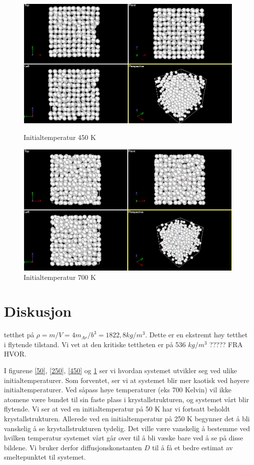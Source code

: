 \documentclass[paper=a4, fontsize=11pt]{scrartcl} %
\numberwithin{equation}{section} %
\numberwithin{figure}{section} %
\numberwithin{table}{section} %
\begin{document}
 \FloatBarrier
\begin{figure}[!htb]
  \includegraphics[width=\linewidth]{T=450}
  \caption{Initialtemperatur 450 K}\label{450}
\endminipage\hfill
{}
  \includegraphics[width=\linewidth]{T=700}
  \caption{Initialtemperatur 700 K}\label{700}
\endminipage\hfill
\end{figure}
 \FloatBarrier


\section{Diskusjon}
tetthet på $\rho = m/V = 4m_{Ar}/b^3 = 1822,8 kg/m^3$. Dette er en ekstremt høy tetthet i flytende tilstand. Vi vet at den kritiske tettheten er på 536 $kg/m^3$ ????? FRA HVOR.

I figurene \ref{50}, \ref{250}, \ref{450} og \ref{700} ser vi hvordan systemet utvikler seg ved ulike initialtemperaturer. Som forventet, ser vi at  systemet blir mer kaotisk ved høyere initialtemperaturer. Ved såpass høye temperaturer (eks 700 Kelvin) vil ikke atomene være bundet til sin faste plass i krystallstrukturen, og systemet vårt blir flytende. Vi ser at ved en initialtemperatur på 50 K har vi fortsatt beholdt krystallstrukturen. Allerede ved en initialtemperatur på 250 K begynner det å bli vanskelig å se krystallstrukturen tydelig. Det ville være vanskelig å bestemme ved hvilken temperatur systemet vårt går over til å bli væske bare ved å se på disse bildene. Vi bruker derfor diffusjonskonstanten $D$ til å få et bedre estimat av smeltepunktet til systemet. 
\end{document}
